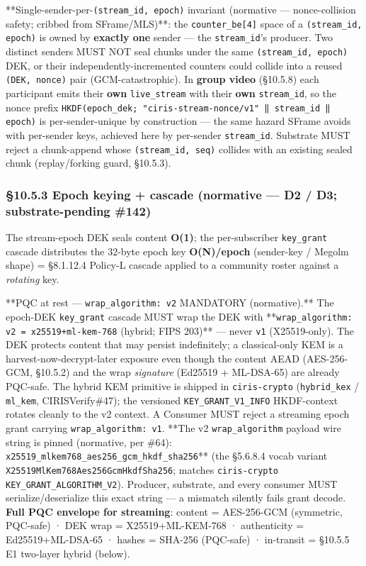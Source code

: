 \documentclass[11pt]{article}
\begin{document}
**Single-sender-per-\texttt{(stream\_id, epoch)} invariant (normative — nonce-collision safety; cribbed from SFrame/MLS)**: the \texttt{counter\_be[4]} space of a \texttt{(stream\_id, epoch)} is owned by \textbf{exactly one} sender — the \texttt{stream\_id}'s producer. Two distinct senders MUST NOT seal chunks under the same \texttt{(stream\_id, epoch)} DEK, or their independently-incremented counters could collide into a reused \texttt{(DEK, nonce)} pair (GCM-catastrophic). In \textbf{group video} (§10.5.8) each participant emits their \textbf{own} \texttt{live\_stream} with their \textbf{own} \texttt{stream\_id}, so the nonce prefix \texttt{HKDF(epoch\_dek; "ciris-stream-nonce/v1" ‖ stream\_id ‖ epoch)} is per-sender-unique by construction — the same hazard SFrame avoids with per-sender keys, achieved here by per-sender \texttt{stream\_id}. Substrate MUST reject a chunk-append whose \texttt{(stream\_id, seq)} collides with an existing sealed chunk (replay/forking guard, §10.5.3).


\subsubsection*{§10.5.3 Epoch keying + cascade (normative — D2 / D3; substrate-pending \#142)}


The stream-epoch DEK seals content \textbf{O(1)}; the per-subscriber \texttt{key\_grant} cascade distributes the 32-byte epoch key \textbf{O(N)/epoch} (sender-key / Megolm shape) = §8.1.12.4 Policy-L cascade applied to a community roster against a \textit{rotating} key.


**PQC at rest — \texttt{wrap\_algorithm: v2} MANDATORY (normative).** The epoch-DEK \texttt{key\_grant} cascade MUST wrap the DEK with **\texttt{wrap\_algorithm: v2 = x25519+ml-kem-768} (hybrid; FIPS 203)** — never \texttt{v1} (X25519-only). The DEK protects content that may persist indefinitely; a classical-only KEM is a harvest-now-decrypt-later exposure even though the content AEAD (AES-256-GCM, §10.5.2) and the wrap \textit{signature} (Ed25519 + ML-DSA-65) are already PQC-safe. The hybrid KEM primitive is shipped in \texttt{ciris-crypto} (\texttt{hybrid\_kex} / \texttt{ml\_kem}, CIRISVerify\#47); the versioned \texttt{KEY\_GRANT\_V1\_INFO} HKDF-context rotates cleanly to the v2 context. A Consumer MUST reject a streaming epoch grant carrying \texttt{wrap\_algorithm: v1}. **The v2 \texttt{wrap\_algorithm} payload wire string is pinned (normative, per \#64): \texttt{x25519\_mlkem768\_aes256\_gcm\_hkdf\_sha256}** (the §5.6.8.4 vocab variant \texttt{X25519MlKem768Aes256GcmHkdfSha256}; matches \texttt{ciris-crypto} \texttt{KEY\_GRANT\_ALGORITHM\_V2}). Producer, substrate, and every consumer MUST serialize/deserialize this exact string — a mismatch silently fails grant decode. \textbf{Full PQC envelope for streaming}: content = AES-256-GCM (symmetric, PQC-safe) · DEK wrap = X25519+ML-KEM-768 · authenticity = Ed25519+ML-DSA-65 · hashes = SHA-256 (PQC-safe) · in-transit = §10.5.5 E1 two-layer hybrid (below).
\end{document}
